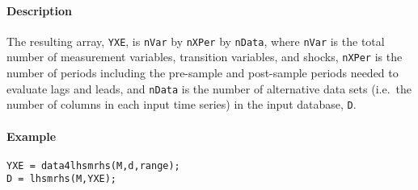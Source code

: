 \paragraph{Description}\label{description}

The resulting array, \texttt{YXE}, is \texttt{nVar} by \texttt{nXPer} by
\texttt{nData}, where \texttt{nVar} is the total number of measurement
variables, transition variables, and shocks, \texttt{nXPer} is the
number of periods including the pre-sample and post-sample periods
needed to evaluate lags and leads, and \texttt{nData} is the number of
alternative data sets (i.e.~the number of columns in each input time
series) in the input database, \texttt{D}.

\paragraph{Example}\label{example}

\begin{verbatim}
YXE = data4lhsmrhs(M,d,range);
D = lhsmrhs(M,YXE);
\end{verbatim}


